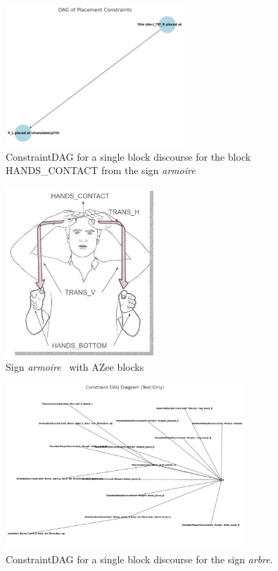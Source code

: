 \documentclass[../../main.tex]{subfiles}
\begin{document}
\begin{figure}[h]
    \centering
    \includegraphics[width=0.6\textwidth]{chapters/multi_track/images/constraint_dag_cupboard.png}
    \caption{ConstraintDAG for a single block discourse for the block HANDS\_CONTACT from the sign \emph{armoire}}
    \label{fig:constraint_dag_armoire}
\end{figure}

\begin{figure}[h]
    \centering
    \includegraphics[width=0.5\textwidth]{chapters/multi_track/images/cupboard.jpg}
    \caption{Sign \emph{armoire}~\cite{moody97} with AZee blocks}
    \label{fig:armoire_sign}
\end{figure}

\begin{figure}[h]
    \centering
    \includegraphics[width=0.8\textwidth]{chapters/multi_track/images/constraint_dag.png}
    \caption{ConstraintDAG for a single block discourse for the sign \emph{arbre}.}
    \label{fig:constraint_dag_tree}
\end{figure}
\end{document}
